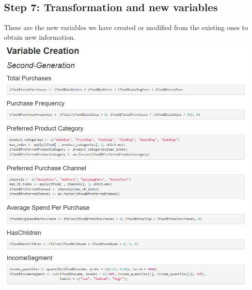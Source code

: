 \subsection{Step 7: Transformation and new variables}
These are the new variables we have created or modified from the existing ones to obtain new information.\\
\includegraphics[width=\textwidth]{Imatges/pre4.png}

